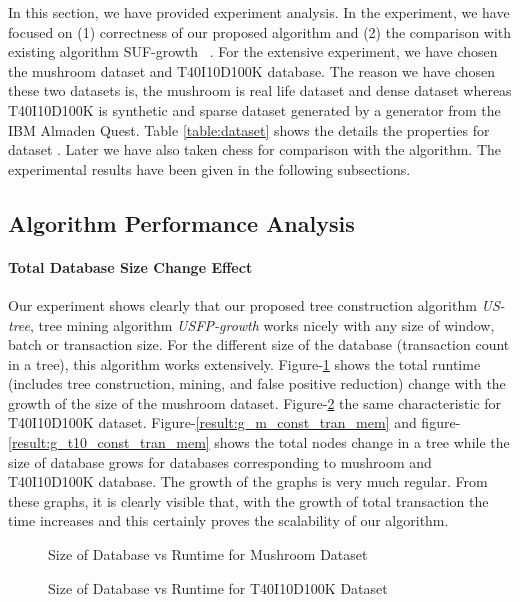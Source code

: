 \documentclass[conference]{IEEEtran}
\begin{document}
In this section, we have provided experiment analysis. In the experiment, we have focused on (1) correctness of our proposed algorithm and (2) the comparison with existing algorithm SUF-growth ~\cite{suf_growth}. For the extensive experiment, we have chosen the mushroom dataset  and T40I10D100K database. The reason we have chosen these two datasets is, the mushroom  is real life dataset and dense dataset whereas T40I10D100K  is synthetic and sparse dataset generated by a generator from the IBM Almaden Quest. Table \ref{table:dataset} shows the details the properties for dataset . Later we have also taken chess  for comparison with the algorithm. The experimental results have been given in the following subsections.
\subsection{Algorithm Performance Analysis}

\paragraph{Total Database Size Change Effect}Our experiment shows clearly that our proposed tree construction algorithm \emph{US-tree}, tree mining algorithm \emph{USFP-growth} works nicely with any size of window, batch or transaction size. For the different size of the database (transaction count in a tree), this algorithm works extensively. Figure-\ref{result:g_m_const_tran} shows the total runtime (includes tree construction, mining, and false positive reduction) change with the growth of the size of the mushroom dataset. Figure-\ref{result:g_t10_const_tran} the same characteristic for T40I10D100K dataset. Figure-\ref{result:g_m_const_tran_mem} and figure-\ref{result:g_t10_const_tran_mem} shows the total nodes change in a tree while the size of database grows for databases corresponding to mushroom and T40I10D100K database. The growth of the graphs is very much regular. From these graphs, it is clearly visible that, with the growth of total transaction the time increases and this certainly proves the scalability of our algorithm. 

        \begin{figure}[h]
        \centering
            
        \caption{Size of Database vs Runtime for Mushroom Dataset }
        \label{result:g_m_const_tran}
        \end{figure}
        \begin{figure}[h]
        \centering
            
        \caption{Size of Database vs Runtime for T40I10D100K Dataset }
        \label{result:g_t10_const_tran}
        \end{figure}
    
\end{document}
